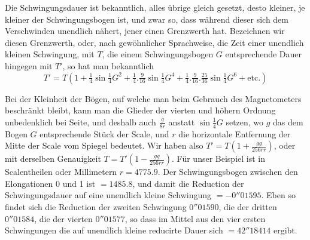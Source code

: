 Die Schwingungsdauer ist bekanntlich, alles übrige gleich gesetzt, desto kleiner, je kleiner der Schwingungsbogen ist, und zwar so, dass während dieser sich dem Verschwinden unendlich nähert, jener einen Grenzwerth hat. Bezeichnen wir diesen Grenzwerth, oder, nach gewöhnlicher Sprachweise, die Zeit einer unendlich kleinen Schwingung, mit $T$, die einem Schwingungsbogen $G$ entsprechende Dauer hingegen mit $T'$, so hat man bekanntlich
\[
T'=T(1+\tfrac14\sin\tfrac14G^2+\tfrac14.\tfrac9{16}\sin\tfrac14G^4+\tfrac14.\tfrac9{16}.\tfrac{25}{36}\sin\tfrac14G^6+\text{etc.})
\]

Bei der Kleinheit der Bögen, auf welche man beim Gebrauch des Magnetometers beschränkt bleibt, kann man die Glieder der vierten und höhern Ordnung unbedenklich bei Seite, und deshalb auch $\frac{g}{8r}$ anstatt $\sin\tfrac14G$ setzen, wo $g$ das dem Bogen $G$ entsprechende Stück der Scale, und $r$ die horizontale Entfernung der Mitte der Scale vom Spiegel bedeutet. Wir haben also $T'=T(1+\frac{gg}{256rr})$, oder mit derselben Genauigkeit $T=T'(1-\frac{gg}{256rr})$. Für unser Beispiel ist in Scalentheilen oder Millimetern $r=4775.9$. Der Schwingungsbogen zwischen den Elongationen 0 und 1 ist $=1485.8$, und damit die Reduction der Schwingungsdauer auf eine unendlich kleine Schwingung $=-0''01595$. Eben so findet sich die Reduction der zweiten Schwingung $0''01590$, die der dritten $0''01584$, die der vierten $0''01577$, so dass im Mittel aus den vier ersten Schwingungen die auf unendlich kleine reducirte Dauer sich $=42''18414$ ergibt.

